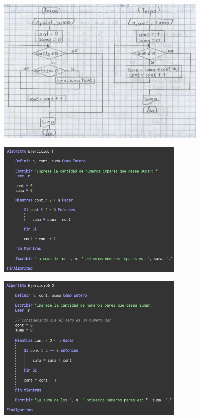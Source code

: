 \documentclass[12pt]{article}
\begin{document}
\begin{enumerate}
                \newpage
                \begin{figure}[!h]
                    \centering
                    \includegraphics[width=0.9\textwidth]{Img/DF_ej6_2.png}
                \end{figure}

                \begin{figure}[!h]
                    \centering
                    \includegraphics[width=0.8\textwidth]{Img/Cod_ej6_1.png}
                \end{figure}

                \begin{figure}[!h]
                    \centering
                    \includegraphics[width=0.8\textwidth]{Img/Cod_ej6_2.png}
                \end{figure}


\end{enumerate}
\end{document}
